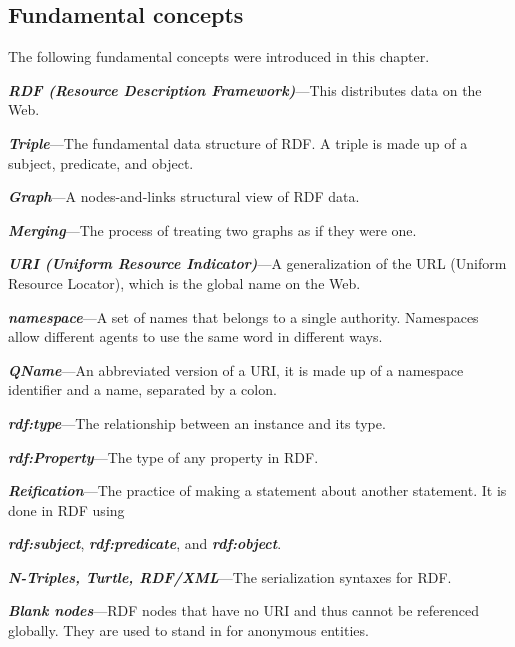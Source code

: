 \subsection{Fundamental concepts}

The following fundamental concepts were introduced in this chapter.

\emph{\textbf{RDF (Resource Description Framework)}}---This distributes
data on the Web.

\emph{\textbf{Triple}}---The fundamental data structure of RDF. A triple
is made up of a subject, predicate, and object.

\emph{\textbf{Graph}}---A nodes-and-links structural view of RDF data.

\emph{\textbf{Merging}}---The process of treating two graphs as if they
were one.

\emph{\textbf{URI (Uniform Resource Indicator)}}---A generalization of
the URL (Uniform Resource Locator), which is the global name on the Web.

\emph{\textbf{namespace}}---A set of names that belongs to a single authority.
Namespaces allow different agents to use the same word in different
ways.

\emph{\textbf{QName}}---An abbreviated version of a URI, it is made up of a
namespace identifier and a name, separated by a colon.

\emph{\textbf{rdf:type}}---The relationship between an instance and its type.

\emph{\textbf{rdf:Property}}---The type of any property in RDF.

\emph{\textbf{Reification}}---The practice of making a statement about another
statement. It is done in RDF using

\emph{\textbf{rdf:subject}}, \emph{\textbf{rdf:predicate}}, and \emph{\textbf{rdf:object}}.

\emph{\textbf{N-Triples, Turtle, RDF/XML}}---The serialization syntaxes for
RDF.

\emph{\textbf{Blank nodes}}---RDF nodes that have no URI and thus cannot be
referenced globally. They are used to stand in for anonymous entities.
